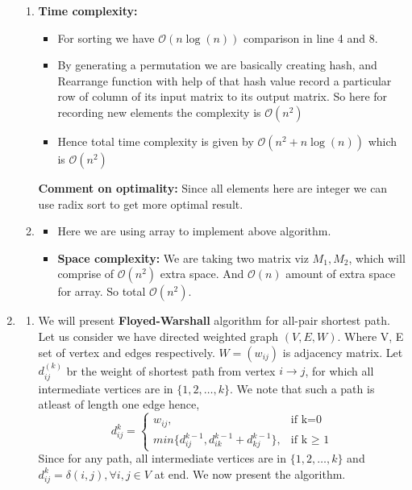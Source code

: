 \documentclass[12pt,a4paper,final]{article}
\theoremstyle{definition}
\begin{document}
\begin{enumerate}
\begin{enumerate}
\item
\textbf{Time complexity: }
\begin{itemize}
\item
For sorting we have $\mathcal{O}(n \log (n))$ comparison in line 4 and 8.
\item
By generating a permutation we are basically creating hash, and Rearrange function with help of that hash value record a particular row of column of its input matrix to its output matrix. So here for recording new elements the complexity is $\mathcal{O}(n^2)$
\item
Hence total time complexity is given by $\mathcal{O}(n^2 + n \log (n))$ which is $\mathcal{O}(n^2)$
\end{itemize}

\textbf{Comment on optimality: }Since all elements here are integer we can use radix sort to get more optimal result.

\item
\begin{itemize}
\item
Here we are using array to implement above algorithm.
\item
\textbf{Space complexity: } We are taking two matrix viz $M_1,M_2$, which will comprise of $\mathcal{O}(n^2)$ extra space. And $\mathcal{O}(n)$ amount of extra space for array. So total $\mathcal{O}(n^2)$.
\end{itemize}

\end{enumerate}


\item
\begin{enumerate}
\item

We will present \textbf{Floyed-Warshall} algorithm for all-pair shortest path.\\
Let us consider we have directed weighted graph $(V,E,W)$. Where V, E set of vertex and edges respectively. $W=(w_{ij})$ is adjacency matrix. Let $d^{(k)}_{ij}$ br the weight of shortest path from vertex $i\to j$, for which all intermediate vertices are in $\{1,2,\dots,k\}$. We note that such a path is atleast of length one edge hence,\\
\[
  d^{k}_{ij} =
  \begin{cases}
                      w_{ij}, & \text{if k=0} \\
                      min \{ d^{k-1}_{ij}, d^{k-1}_{ik} + d^{k-1}_{kj} \},  & \text{if k $\geq$ 1}
  \end{cases}
\]
Since for any path, all intermediate vertices are in $\{1,2,\dots,k\}$ and $ d^{k}_{ij} = \delta (i,j), \forall i,j \in V$ at end. We now present the algorithm.


\end{enumerate}
\end{enumerate}
\end{document}
